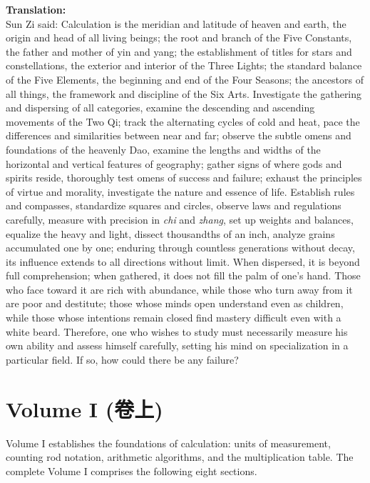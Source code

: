 \documentclass[11pt,a4paper]{article}
\newcommand{\zh}[1]{{\CJKfamily{}#1}}
\begin{document}
\textbf{Translation:}\\[0.2cm]
Sun Zi said: Calculation is the meridian and latitude of heaven and earth, the origin and head of all living beings; the root and branch of the Five Constants, the father and mother of yin and yang; the establishment of titles for stars and constellations, the exterior and interior of the Three Lights; the standard balance of the Five Elements, the beginning and end of the Four Seasons; the ancestors of all things, the framework and discipline of the Six Arts. Investigate the gathering and dispersing of all categories, examine the descending and ascending movements of the Two Qi; track the alternating cycles of cold and heat, pace the differences and similarities between near and far; observe the subtle omens and foundations of the heavenly Dao, examine the lengths and widths of the horizontal and vertical features of geography; gather signs of where gods and spirits reside, thoroughly test omens of success and failure; exhaust the principles of virtue and morality, investigate the nature and essence of life. Establish rules and compasses, standardize squares and circles, observe laws and regulations carefully, measure with precision in \textit{chi} and \textit{zhang}, set up weights and balances, equalize the heavy and light, dissect thousandths of an inch, analyze grains accumulated one by one; enduring through countless generations without decay, its influence extends to all directions without limit. When dispersed, it is beyond full comprehension; when gathered, it does not fill the palm of one's hand. Those who face toward it are rich with abundance, while those who turn away from it are poor and destitute; those whose minds open understand even as children, while those whose intentions remain closed find mastery difficult even with a white beard. Therefore, one who wishes to study must necessarily measure his own ability and assess himself carefully, setting his mind on specialization in a particular field. If so, how could there be any failure?

\newpage

\section{Volume I (\zh{卷上})}

Volume I establishes the foundations of calculation: units of measurement, counting rod notation, arithmetic algorithms, and the multiplication table. The complete Volume I comprises the following eight sections.
\end{document}
